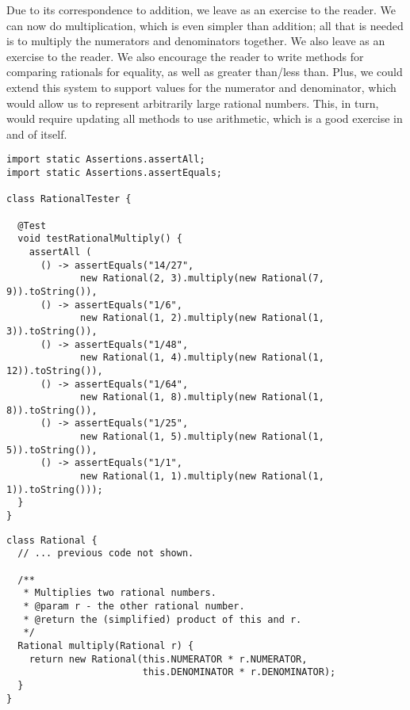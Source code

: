 Due to its correspondence to addition, we leave  as an exercise to the reader. We can now do multiplication, which is even simpler than addition; all that is needed is to multiply the numerators and denominators together. We also leave  as an exercise to the reader. We also encourage the reader to write methods for comparing rationals for equality, as well as greater than/less than. Plus, we could extend this system to support  values for the numerator and denominator, which would allow us to represent arbitrarily large rational numbers. This, in turn, would require updating all methods to use  arithmetic, which is a good exercise in and of itself.

\begin{lstlisting}[language=MyJava]
import static Assertions.assertAll;
import static Assertions.assertEquals;

class RationalTester {

  @Test
  void testRationalMultiply() {
    assertAll (
      () -> assertEquals("14/27", 
             new Rational(2, 3).multiply(new Rational(7, 9)).toString()),
      () -> assertEquals("1/6", 
             new Rational(1, 2).multiply(new Rational(1, 3)).toString()),
      () -> assertEquals("1/48", 
             new Rational(1, 4).multiply(new Rational(1, 12)).toString()),
      () -> assertEquals("1/64", 
             new Rational(1, 8).multiply(new Rational(1, 8)).toString()),
      () -> assertEquals("1/25", 
             new Rational(1, 5).multiply(new Rational(1, 5)).toString()),
      () -> assertEquals("1/1", 
             new Rational(1, 1).multiply(new Rational(1, 1)).toString()));
  }
}
\end{lstlisting}

\begin{lstlisting}[language=MyJava]
class Rational {
  // ... previous code not shown.

  /**
   * Multiplies two rational numbers.
   * @param r - the other rational number.
   * @return the (simplified) product of this and r.
   */
  Rational multiply(Rational r) {
    return new Rational(this.NUMERATOR * r.NUMERATOR, 
                        this.DENOMINATOR * r.DENOMINATOR);
  }
}
\end{lstlisting}

